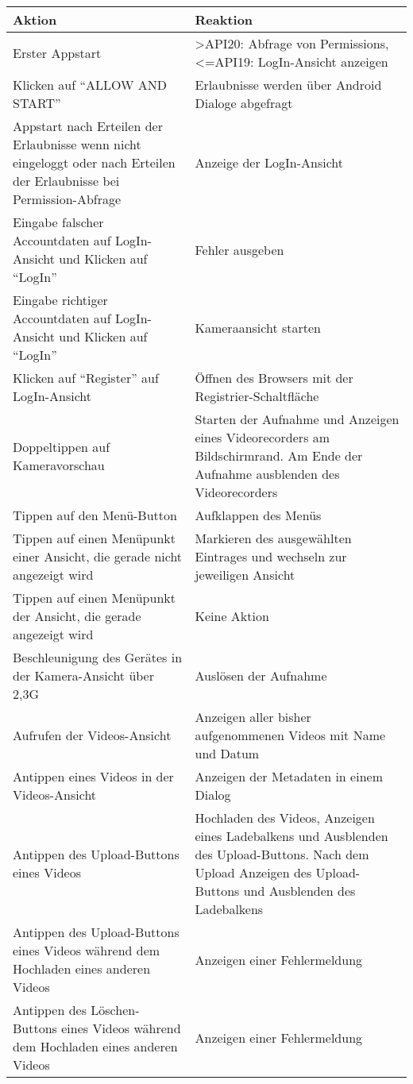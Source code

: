 \begin{longtable}{p{} | p{}}
\hline
\textbf{Aktion} & \textbf{Reaktion}\\
\hline
Erster Appstart & >API20: Abfrage von Permissions, <=API19: LogIn-Ansicht anzeigen\\
\hline
Klicken auf ``ALLOW AND START'' & Erlaubnisse werden über Android Dialoge abgefragt\\
\hline
Appstart nach Erteilen der Erlaubnisse wenn nicht eingeloggt oder nach Erteilen der Erlaubnisse bei Permission-Abfrage & Anzeige der LogIn-Ansicht\\
\hline
Eingabe falscher Accountdaten auf LogIn-Ansicht und Klicken auf ``LogIn'' & Fehler ausgeben\\
\hline
Eingabe richtiger Accountdaten auf LogIn-Ansicht und Klicken auf ``LogIn'' & Kameraansicht starten \\
\hline
Klicken auf ``Register'' auf LogIn-Ansicht & Öffnen des Browsers mit der Registrier-Schaltfläche\\
\hline
Doppeltippen auf Kameravorschau & Starten der Aufnahme und Anzeigen eines Videorecorders am Bildschirmrand. Am Ende der Aufnahme ausblenden des Videorecorders \\
\hline  
Tippen auf den Menü-Button & Aufklappen des Menüs\\
\hline  
Tippen auf einen Menüpunkt einer Ansicht, die gerade nicht angezeigt wird & Markieren des ausgewählten Eintrages und wechseln zur jeweiligen Ansicht\\
\hline
Tippen auf einen Menüpunkt der Ansicht, die gerade angezeigt wird & Keine Aktion\\
\hline
Beschleunigung des Gerätes in der Kamera-Ansicht über 2,3G & Auslösen der Aufnahme\\
\hline
Aufrufen der Videos-Ansicht & Anzeigen aller bisher aufgenommenen Videos mit Name und Datum\\
\hline
Antippen eines Videos in der Videos-Ansicht & Anzeigen der Metadaten in einem Dialog\\
\hline
Antippen des Upload-Buttons eines Videos & Hochladen des Videos, Anzeigen eines Ladebalkens und Ausblenden des Upload-Buttons. Nach dem Upload Anzeigen des Upload-Buttons und Ausblenden des Ladebalkens\\
\hline
Antippen des Upload-Buttons eines Videos während dem Hochladen eines anderen Videos & Anzeigen einer Fehlermeldung\\
\hline
Antippen des Löschen-Buttons eines Videos während dem Hochladen eines anderen Videos & Anzeigen einer Fehlermeldung\\

\end{longtable}
